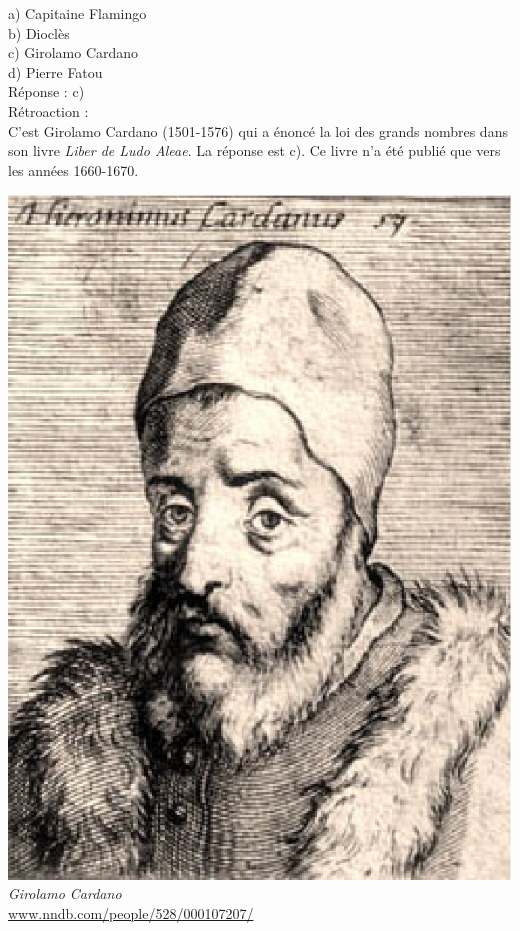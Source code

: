 \documentclass[letterpaper, 12pt]{article}
\begin{document}
a) Capitaine Flamingo\\
b) Diocl\`es\\
c) Girolamo Cardano\\
d) Pierre Fatou\\

R\'eponse : c)\\

R\'etroaction :\\
C'est Girolamo Cardano (1501-1576) qui a \'enonc\'e la loi des grands nombres dans son livre \og \emph{Liber de Ludo Aleae}\fg. La r\'eponse est c). Ce livre n'a \'et\'e publi\'e que vers les ann\'ees 1660-1670.\\
\begin{center}
\includegraphics[scale=0.25]{Cardano.eps}\\
\emph{{\small Girolamo Cardano}}\\
\href{http://www.nndb.com/people/528/000107207/}{www.nndb.com/people/528/000107207/}\\[5mm]
\end{center}
\end{document}
